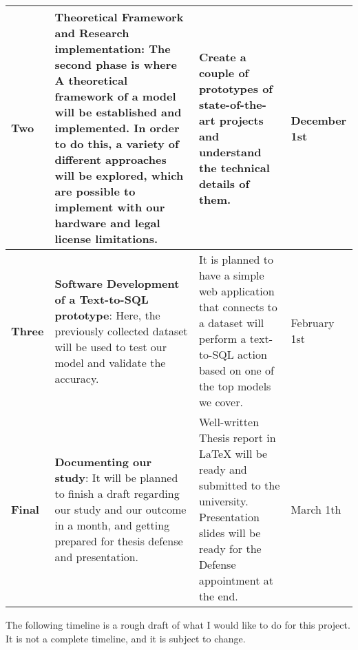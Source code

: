 \begin{tabular}{|l|p{6.5cm}|p{5cm}|l|}
    \hline
    \textbf{Two}   & \textbf{Theoretical Framework and Research implementation}: The second phase is where A theoretical framework of a model will be established and implemented. In order to do this, a variety of different approaches will be explored, which are possible to implement with our hardware and legal license limitations.                                                                                                                                                 & Create a couple of prototypes of state-of-the-art projects and understand the technical details of them.                                                                                                                                           & December 1st      \\
    \hline
    \textbf{Three} & \textbf{Software Development of a Text-to-SQL prototype}: Here, the previously collected dataset will be used to test our model and validate the accuracy.                                                                                                                                                                                                                                                                                                              & It is planned to have a simple web application that connects to a dataset will perform a text-to-SQL action based on one of the top models we cover.                                                                                               & February 1st      \\
    \hline
    \textbf{Final} & \textbf{Documenting our study}: It will be planned to finish a draft regarding our study and our outcome in a month, and getting prepared for thesis defense and presentation.                                                                                                                                                                                                                                                                                          & Well-written Thesis report in LaTeX will be ready and submitted to the university. Presentation slides will be ready for the Defense appointment at the end.                                                                                       & March 1th         \\
    \hline
\end{tabular}

\newpage

The following timeline is a rough draft of what I would like to do for this project. It is not a complete timeline, and it is subject to change.

